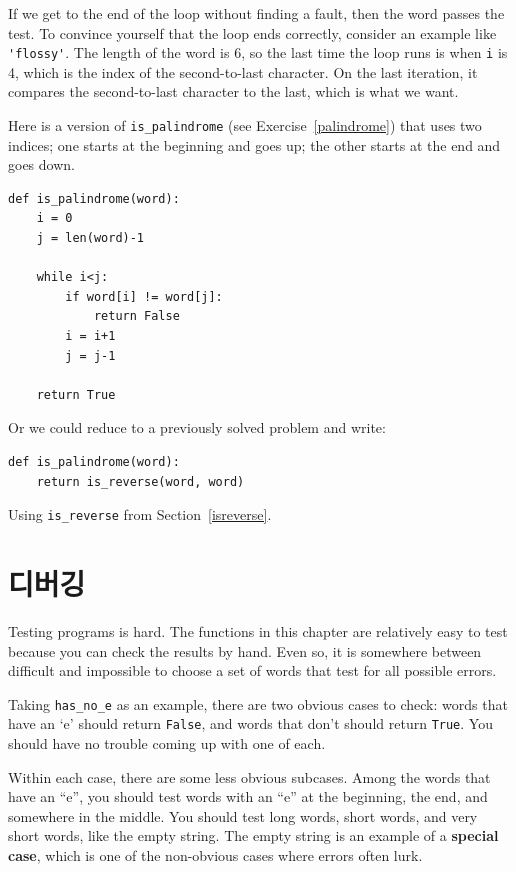 \documentclass[10pt]{book}
\begin{document}
If we get to the end of the loop without finding a fault, then the
word passes the test.  To convince yourself that the loop ends
correctly, consider an example like \verb"'flossy'".  The
length of the word is 6, so
the last time the loop runs is when {\tt i} is 4, which is the
index of the second-to-last character.  On the last iteration,
it compares the second-to-last character to the last, which is
what we want.

Here is a version of \verb"is_palindrome" (see
Exercise~\ref{palindrome}) that uses two indices; one starts at the
beginning and goes up; the other starts at the end and goes down.

\begin{verbatim}
def is_palindrome(word):
    i = 0
    j = len(word)-1

    while i<j:
        if word[i] != word[j]:
            return False
        i = i+1
        j = j-1

    return True
\end{verbatim}

Or we could reduce to a previously solved
problem and write:

\begin{verbatim}
def is_palindrome(word):
    return is_reverse(word, word)
\end{verbatim}
%
Using \verb"is_reverse" from Section~\ref{isreverse}.


\section{디버깅}

Testing programs is hard.  The functions in this chapter are
relatively easy to test because you can check the results by hand.
Even so, it is somewhere between difficult and impossible to choose a
set of words that test for all possible errors.

Taking \verb"has_no_e" as an example, there are two obvious
cases to check: words that have an `e' should return {\tt False}, and
words that don't should return {\tt True}.  You should have no
trouble coming up with one of each.

Within each case, there are some less obvious subcases.  Among the
words that have an ``e'', you should test words with an ``e'' at the
beginning, the end, and somewhere in the middle.  You should test long
words, short words, and very short words, like the empty string.  The
empty string is an example of a {\bf special case}, which is one of
the non-obvious cases where errors often lurk.
\end{document}
